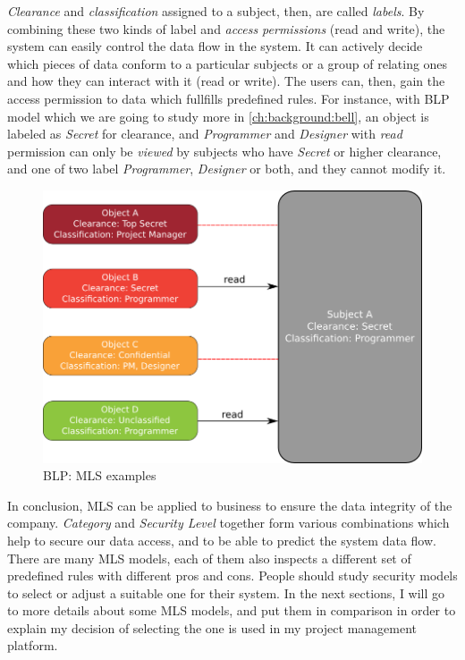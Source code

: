 \emph{Clearance} and \emph{classification} assigned to a subject, then, are called \emph{labels}.
By combining these two kinds of label and \emph{access permissions} (read and write), the system can easily control the data flow in the system.
It can actively decide which pieces of data conform to a particular subjects or a group of relating ones and how they can interact with it (read or write).
The users can, then, gain the access permission to data which fullfills predefined rules.
For instance, with BLP model which we are going to study more in \autoref{ch:background:bell}, an object is labeled as \emph{Secret} for clearance, and \emph{Programmer} and \emph{Designer} with \emph{read} permission can only be \emph{viewed} by subjects who have \emph{Secret} or higher clearance, and one of two label \emph{Programmer}, \emph{Designer} or both, and they cannot modify it.

\begin{figure}[bth]                                                                                                                                                  
\myfloatalign
\includegraphics[width=1.0\linewidth]{gfx/chapter_2/mls_example}
\caption[BLP: MLS examples]{BLP: MLS examples}\label{fig:mls_example}
\end{figure}

In conclusion, MLS can be applied to business to ensure the data integrity of the company.
\emph{Category} and \emph{Security Level} together form various combinations which help to secure our data access, and to be able to predict the system data flow.
There are many MLS models, each of them also inspects a different set of predefined rules with different pros and cons.
People should study security models to select or adjust a suitable one for their system. 
In the next sections, I will go to more details about some MLS models, and put them in comparison in order to explain my decision of selecting the one is used in my project management platform.

